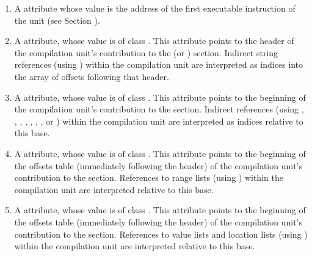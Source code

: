 \begin{enumerate}[1. ]
\item
\hypertarget{chap:DWATentrypcofcompileunit}{}
\hypertarget{chap:DWATentrypcofpartialunit}{}
A \DWATentrypc{} attribute whose value is the address of the first
executable instruction of the unit (see
Section ).

\item \hypertarget{chap:DWATstroffsetforindirectstringsection}{}
\bb
A \DWATstroffsetsDEFN{}
\eb
attribute, whose value is of class \CLASSstroffsetsptr.
This attribute points to the
\bb
header
\eb
of the compilation unit's contribution to the
\dotdebugstroffsets{} (or \dotdebugstroffsetsdwo{}) section.
Indirect string references
(using \DWFORMstrxXNor) within the compilation unit are
interpreted as indices
\bb
into the array of offsets following that header.
\eb

\item \hypertarget{chap:DWATaddrbaseforaddresstable}{}
A \DWATaddrbaseDEFN{}
attribute, whose value is of class \CLASSaddrptr.
This attribute points to the beginning of the compilation
unit's contribution to the \dotdebugaddr{} section.
Indirect references (using \DWFORMaddrxXN, \DWOPaddrx,
\DWOPconstx,
\DWLLEbaseaddressx{}, \DWLLEstartxendx{}, \DWLLEstartxlength{},
\DWRLEbaseaddressx{}, \DWRLEstartxendx{} or \DWRLEstartxlength)
within the compilation unit are interpreted as indices
relative to this base.

\item \hypertarget{chap:DWATrnglistsbaseforrnglists}{}
A \DWATrnglistsbaseDEFN{}
attribute, whose value is of class \CLASSrnglistsptr.
This attribute points to the beginning of the offsets table
(immediately following the header) of the compilation
unit's contribution to the \dotdebugrnglists{} section.
References to range lists (using \DWFORMrnglistx)
within the compilation unit are
interpreted relative to this base.

\item \hypertarget{chap:DWATloclistsbaseinlocationlist}{}
A \DWATloclistsbaseDEFN{}
attribute, whose value is of class \CLASSloclistsptr.
This attribute points to the beginning of the offsets table
(immediately following the header) of the compilation unit's
contribution to the \dotdebugloclists{} section. References to
\bb
value lists and
\eb
location lists (using \DWFORMloclistx) within the compilation
unit are interpreted relative to this base.
\end{enumerate}

